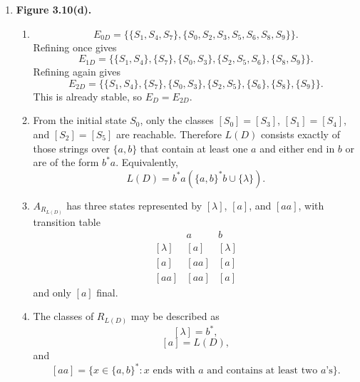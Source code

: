 \begin{enumerate}[{3.}1.]
\begin{enumerate}
\item $C/_{E_C}$ has the four states
\[
[q_1],\ [q_4],\ [q_0]=[q_2],\ [q_3]=[q_5].
\]
The initial state is $[q_0]=[q_2]$, the final states are $[q_1]$ and $[q_4]$,
and the transition table is
\[
\begin{array}{c|cc}
 & 0 & 1\\\hline
{}[q_0]=[q_2] & [q_3]=[q_5] & [q_1]\\
{}[q_1] & [q_0]=[q_2] & [q_1]\\
{}[q_3]=[q_5] & [q_3]=[q_5] & [q_3]=[q_5]\\
{}[q_4] & [q_3]=[q_5] & [q_3]=[q_5]
\end{array}
\]
The state $[q_4]$ is disconnected, so $C/_{E_C}$ is not connected; its
connected part is isomorphic to $A_{R_{L(C)}}$.
\end{enumerate}

\item \textbf{Figure 3.10(d).}

\begin{enumerate}
\item
\[
E_{0D}=\{\{S_1,S_4,S_7\},\{S_0,S_2,S_3,S_5,S_6,S_8,S_9\}\}.
\]
Refining once gives
\[
E_{1D}=\{\{S_1,S_4\},\{S_7\},\{S_0,S_3\},\{S_2,S_5,S_6\},\{S_8,S_9\}\}.
\]
Refining again gives
\[
E_{2D}=\{\{S_1,S_4\},\{S_7\},\{S_0,S_3\},\{S_2,S_5\},\{S_6\},\{S_8\},\{S_9\}\}.
\]
This is already stable, so $E_D=E_{2D}$.

\item From the initial state $S_0$, only the classes
$[S_0]=[S_3]$, $[S_1]=[S_4]$, and $[S_2]=[S_5]$ are reachable. Therefore
$L(D)$ consists exactly of those strings over $\{a,b\}$ that contain at least
one $a$ and either end in $b$ or are of the form $b^*a$. Equivalently,
\[
L(D)=b^*a(\{a,b\}^*b\cup\{\lambda\}).
\]

\item $A_{R_{L(D)}}$ has three states represented by $[\lambda]$, $[a]$, and
$[aa]$, with transition table
\[
\begin{array}{c|cc}
 & a & b\\\hline
{}[\lambda] & [a] & [\lambda]\\
{}[a] & [aa] & [a]\\
{}[aa] & [aa] & [a]
\end{array}
\]
and only $[a]$ final.

\item The classes of $R_{L(D)}$ may be described as
\[
[\lambda]=b^*,
\]
\[
[a]=L(D),
\]
and
\[
[aa]=\{x\in\{a,b\}^*: x\text{ ends with }a\text{ and contains at least two }a\text{'s}\}.
\]


\end{enumerate}
\end{enumerate}
